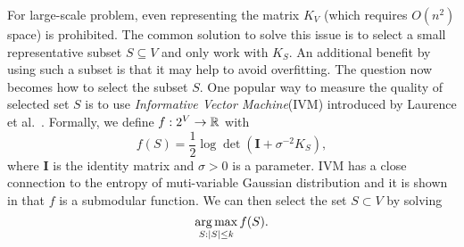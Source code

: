 For large-scale problem, even representing the matrix $K_V$ (which requires $O(n^2)$ space) is prohibited. The common solution to solve this issue is to select a small representative subset $S \subseteq V$ and only work with $K_S$. An additional benefit by using such a subset is that it may help to avoid overfitting. The question now becomes how to select the subset $S$. One popular way to measure the quality of selected set $S$ is to use \emph{Informative Vector Machine}(IVM) introduced by Laurence et al.\ \cite{LSH03}. Formally, we define $f: 2^V \rightarrow \mathbb{R}$ with
$$f(S) = \frac{1}{2} \log\det\left( \mathbf{I} + \sigma^{-2} K_S \right),$$
where $\mathbf{I}$ is the identity matrix and $\sigma > 0$ is a parameter. IVM has a close connection to the entropy of  muti-variable Gaussian distribution \cite{B14} and it is shown in \cite{S04,B14} that $f$ is a submodular function. We can then select the set $S\subset V$ by solving
$$\operatorname*{arg\,max}_{S:|S|\leq k} f(S).$$






